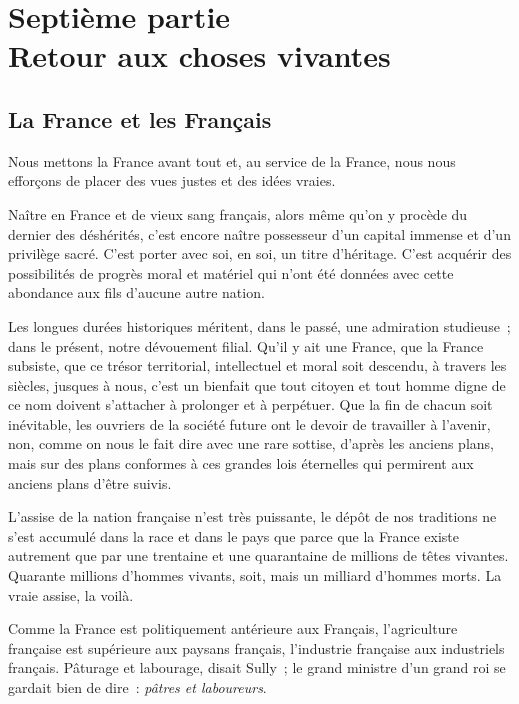 \documentclass[french,twoside]{book} %
\newcommand{\astermono}{\medskip\centerline{\color{rubric}\large\selectfont{\syms ✻}}\medskip\par}%
\newcommand\chapteropen{} %
\newcommand\chaptercont{} %
\begin{document}
\chapteropen
\chapter[{Septième partie. Retour aux choses vivantes}]{Septième partie \\
Retour aux choses vivantes}\renewcommand{\leftmark}{Septième partie \\
Retour aux choses vivantes}


\chaptercont
\section[{La France et les Français}]{La France et les Français}
\noindent Nous mettons la France avant tout et, au service de la France, nous nous efforçons de placer des vues justes et des idées vraies.\par
Naître en France et de vieux sang français, alors même qu’on y procède du dernier des déshérités, c’est encore naître possesseur d’un capital immense et d’un privilège sacré. C’est porter avec soi, en soi, un titre d’héritage. C’est acquérir des possibilités de progrès moral et matériel qui n’ont été données avec cette abondance aux fils d’aucune autre nation.\par

\astermono

\noindent Les longues durées historiques méritent, dans le passé, une admiration studieuse ; dans le présent, notre dévouement filial. Qu’il y ait une France, que la France subsiste, que ce trésor territorial, intellectuel et moral soit descendu, à travers les siècles, jusques à nous, c’est un bienfait que tout citoyen et tout homme digne de ce nom doivent s’attacher à prolonger et à perpétuer. Que la fin de chacun soit inévitable, les ouvriers de la société future ont le devoir de travailler à l’avenir, non, comme on nous le fait dire avec une rare sottise, d’après les anciens plans, mais sur des plans conformes à ces grandes lois éternelles qui permirent aux anciens plans d’être suivis.\par

\astermono

\noindent L’assise de la nation française n’est très puissante, le dépôt de nos traditions ne s’est accumulé dans la race et dans le pays que parce que la France existe autrement que par une trentaine et une quarantaine de millions de têtes vivantes. Quarante millions d’hommes vivants, soit, mais un milliard d’hommes morts. La vraie assise, la voilà.\par
Comme la France est politiquement antérieure aux Français, l’agriculture française est supérieure aux paysans français, l’industrie française aux industriels français. Pâturage et labourage, disait Sully ; le grand ministre d’un grand roi se gardait bien de dire : \emph{pâtres et laboureurs}.
\end{document}
